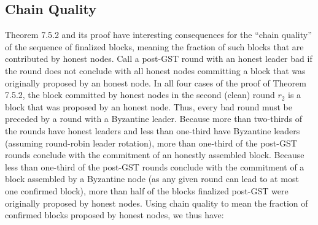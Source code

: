 \subsection{Chain Quality}
Theorem 7.5.2 and its proof have interesting consequences for the “chain quality” of the
sequence of finalized blocks, meaning the fraction of such blocks that are contributed by
honest nodes.
Call a post-GST round with an honest leader bad if the round does not conclude with
all honest nodes committing a block that was originally proposed by an honest node. In all
four cases of the proof of Theorem 7.5.2, the block committed by honest nodes in the second
(clean) round $r_2$ is a block that was proposed by an honest node. Thus, every bad round must be preceded by a round with a Byzantine leader. Because more than two-thirds of
the rounds have honest leaders and less than one-third have Byzantine leaders (assuming
round-robin leader rotation), more than one-third of the post-GST rounds conclude with the
commitment of an honestly assembled block. Because less than one-third of the post-GST
rounds conclude with the commitment of a block assembled by a Byzantine node (as any
given round can lead to at most one confirmed block), more than half of the blocks finalized
post-GST were originally proposed by honest nodes. Using chain quality to mean the fraction
of confirmed blocks proposed by honest nodes, we thus have:


